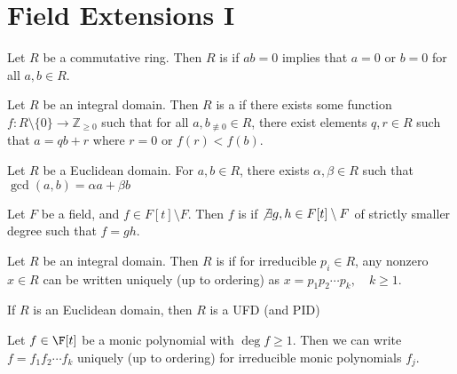 \documentclass[a4paper]{article}
\begin{document}
\section{Field Extensions I}
\begin{tdefinition}
  Let \( R \) be a commutative ring. Then \( R \) is  if \( ab=0 \) implies that \( a=0 \) or \( b=0 \) for all \( a,b\in R \).
\end{tdefinition}

\begin{tdefinition}
  Let \( R \) be an integral domain. Then \( R \) is a  if there exists some function \( f:R\setminus\{0\}\to \mathbb{Z}_{\geq 0} \) such that for all \( a,b_{\not\equiv 0} \in R \), there exist elements \( q,r\in R \) such that \( a=qb+r \) where \( r=0 \) or \( f(r)<f(b) \).
\end{tdefinition}

\begin{ttheorem}
  Let \( R \) be a Euclidean domain. For \( a,b\in R \), there exists \( \alpha,\beta\in R \) such that \( \gcd(a,b) = \alpha a+\beta b \)
\end{ttheorem}

\begin{tdefinition}[Irreducible]
  Let \( {F} \) be a field, and \( f\in F[t]\setminus F \).
  Then \( f \) is  if \( \not\exists g,h\in F[t]\setminus F \) of strictly smaller degree such that \( f=gh \).
\end{tdefinition}

\begin{tdefinition}
  Let \( R \) be an integral domain.
  Then \( R \) is  if for irreducible \( p_i\in R \), any nonzero \( x\in R \) can be written uniquely (up to ordering) as \( x=p_1p_2\cdots p_k,\quad k\geq 1 \).
\end{tdefinition}

\quad If \( R \) is an Euclidean domain, then \( R \) is a UFD (and PID)

\begin{tcorollary}
  Let \( f\in \F[t] \) be a monic polynomial with \( \deg f\geq 1 \).
  Then we can write \( f = f_1f_2\cdots f_k \) uniquely (up to ordering) for irreducible monic polynomials \( f_j \).
\end{tcorollary}
\end{document}
